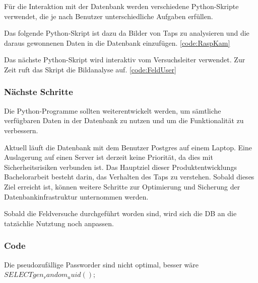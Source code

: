 Für die Interaktion mit der Datenbank werden verschiedene Python-Skripte verwendet, die je nach Benutzer unterschiedliche Aufgaben erfüllen.

Das folgende Python-Skript ist dazu da Bilder von Taps zu analysieren und die daraus gewonnenen Daten in die Datenbank einzufügen. \ref{code:RaspKam}

Das nächste Python-Skript wird interaktiv vom Versuchsleiter verwendet. Zur Zeit ruft das Skript die Bildanalyse auf. \ref{code:FeldUser}


\subsubsection{Nächste Schritte}

Die Python-Programme sollten weiterentwickelt werden, um sämtliche verfügbaren Daten in der Datenbank zu nutzen und um die Funktionalität zu verbessern.

Aktuell läuft die Datenbank mit dem Benutzer Postgres auf einem Laptop. Eine Auslagerung auf einen Server ist derzeit keine Priorität, da dies mit Sicherheitsrisiken verbunden ist. Das Hauptziel dieser Produktentwicklungs Bachelorarbeit besteht darin, das Verhalten des Taps zu verstehen. Sobald dieses Ziel erreicht ist, können weitere Schritte zur Optimierung und Sicherung der Datenbankinfrastruktur unternommen werden.

Sobald die Feldversuche durchgeführt worden sind, wird sich die DB an die tatzächlie Nutztung noch anpassen.

\subsubsection{Code}
\label{sect:code}



Die pseudozufällige Passworder sind nicht optimal, besser wäre $SELECT gen_random_uuid();$











